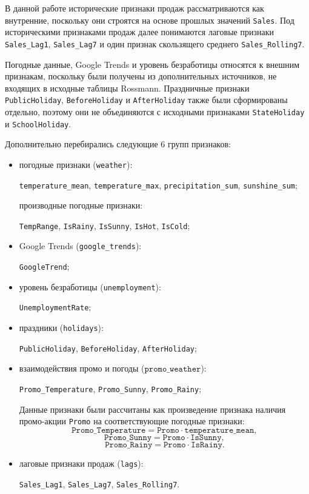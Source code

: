 \documentclass[12pt,a4paper]{article}
\numberwithin{equation}{section}
\begin{document}
В данной работе исторические признаки продаж рассматриваются как внутренние, поскольку они строятся на основе прошлых значений \texttt{Sales}. Под историческими признаками продаж далее понимаются лаговые признаки \texttt{Sales\_Lag1}, \texttt{Sales\_Lag7} и один признак скользящего среднего \texttt{Sales\_Rolling7}.

Погодные данные, Google Trends и уровень безработицы относятся к внешним признакам, поскольку были получены из дополнительных источников, не входящих в исходные таблицы Rossmann. Праздничные признаки \texttt{PublicHoliday}, \texttt{BeforeHoliday} и \texttt{AfterHoliday} также были сформированы отдельно, поэтому они не объединяются с исходными признаками \texttt{StateHoliday} и \texttt{SchoolHoliday}.

Дополнительно перебирались следующие 6 групп признаков:
\begin{itemize}
    \item погодные признаки (\texttt{weather}):
    
    \texttt{temperature\_mean},
    \texttt{temperature\_max},
    \texttt{precipitation\_sum},
    \texttt{sunshine\_sum};

    производные погодные признаки:
    
    \texttt{TempRange},
    \texttt{IsRainy},
    \texttt{IsSunny},
    \texttt{IsHot},
    \texttt{IsCold};

    \item Google Trends (\texttt{google\_trends}):
    
    \texttt{GoogleTrend};

    \item уровень безработицы (\texttt{unemployment}):
    
    \texttt{UnemploymentRate};

    \item праздники (\texttt{holidays}):
    
    \texttt{PublicHoliday},
    \texttt{BeforeHoliday},
    \texttt{AfterHoliday};

    \item взаимодействия промо и погоды (\(\texttt{promo\_weather}\)):
    
    \texttt{Promo\_Temperature},
    \texttt{Promo\_Sunny},
    \texttt{Promo\_Rainy};
	
	Данные признаки были рассчитаны как произведение признака наличия промо-акции
\texttt{Promo} на соответствующие погодные признаки:
\[
\texttt{Promo\_Temperature} = \texttt{Promo} \cdot \texttt{temperature\_mean},
\]
\[
\texttt{Promo\_Sunny} = \texttt{Promo} \cdot \texttt{IsSunny},
\]
\[
\texttt{Promo\_Rainy} = \texttt{Promo} \cdot \texttt{IsRainy}.
\]

    \item лаговые признаки продаж (\texttt{lags}):
    
    \texttt{Sales\_Lag1},
    \texttt{Sales\_Lag7},
    \texttt{Sales\_Rolling7}.
\end{itemize}
\end{document}
